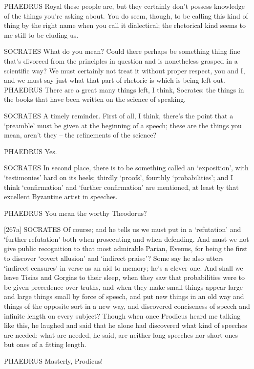 PHAEDRUS Royal these people
are, but they certainly
don't possess knowledge of the things you're asking about. You do seem,
though, to be calling this kind of thing by the right name when you call
it dialectical; the rhetorical kind seems to me still to be eluding
us.

SOCRATES What do you mean? Could there perhaps be something 
thing fine that's divorced from the principles in question and is
nonetheless grasped in a scientific way? We must certainly not treat it
without proper respect, you and I, and we must say just what that part
of rhetoric is which is being left out. PHAEDRUS There are a great many
things left, I think, Socrates:  the things in the books that
have been written on the science of speaking.

SOCRATES A timely reminder. First of all, I think, there's the point
that a ‘preamble' must be given at the beginning of a speech; these are
the things you mean, aren't they -- the refinements of the science?

PHAEDRUS Yes. 

SOCRATES In second place, there is to be something called an
‘exposition', with ‘testimonies' hard on its heels; thirdly ‘proofs',
fourthly ‘probabilities'; and I think ‘confirmation' and ‘further
confirmation' are mentioned, at least by that excellent 
Byzantine artist in speeches.

PHAEDRUS You mean the worthy
Theodorus?

{[}267a{]} SOCRATES Of course; and he tells us we must put in a
‘refutation' and ‘further refutation' both when prosecuting and when
defending. And must we not give public recognition to that most
admirable Parian, Evenus, for being the first to discover ‘covert
allusion' and ‘indirect praise'? Some say he also  utters
‘indirect censures' in verse as an aid to memory; he's a clever one. And
shall we leave Tisias and Gorgias to their sleep, when they saw that
probabilities were to be given precedence over truths, and when they
make small things appear large and  large things small by
force of speech, and put
new things in an old way and things of the opposite sort in a new way,
and discovered conciseness of speech and infinite length on every
subject? Though when once Prodicus heard me talking like this, he
laughed and said that he alone had discovered what kind of speeches are
needed: what are needed, he said, are neither long  speeches nor
short ones but ones of a fitting length.

PHAEDRUS Masterly, Prodicus!

